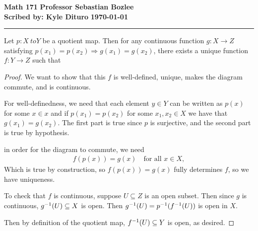 \documentclass[12pt, twosided]{article}
\begin{document}
\noindent \textbf{Math 171} \hfill \textbf{Professor Sebastian Bozlee} \\
\textbf{Scribed by: Kyle Dituro} \hfill \textbf{\today}\hrule
\vspace{.2in}

\begin{thm}
  Let \(p: X\ to Y\) be a quotient map. Then for any continuous function \(g: X \to Z\) satisfying \(p(x_1) = p(x_2) \Rightarrow g(x_1) = g(x_2)\), there exists a unique function \(f: Y \to Z\) such that
  \begin{center}
  \end{center}
\end{thm}

\begin{proof}
  We want to show that this \(f\) is well-defined, unique, makes the diagram commute, and is continuous.

  For well-definedness, we need that each element \(y \in Y\) can be written as \(p(x)\) for some \(x \in x\) and if \(p(x_1) = p(x_2)\) for some \(x_1, x_2 \in X\) we have that \(g(x_1) = g(x_2)\). The first part is true since \(p\) is surjective, and the second part is true by hypothesis.

  in order for the diagram to commute, we need
  \begin{align*}
    f(p(x)) = g(x) \quad \text{for all } x\in X,
  \end{align*}
  Which is true by construction, so \(f(p(x)) = g(x)\) fully determines \(f\), so we have uniqueness.

  To check that \(f\) is continuous, suppose \(U \subseteq Z\) is an open subset. Then since \(g\) is continuous, \(g^{-1}(U) \subseteq X\) is open. Then \(g^{-1}(U) = p^{-1}(f^{-1}(U))\) is open in \(X\).

  Then by definition of the quotient map, \(f^{-1}(U) \subseteq Y\) is open, as desired.
\end{proof}
\end{document}
